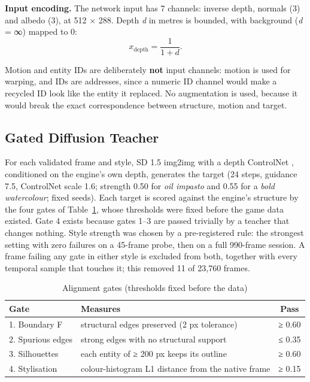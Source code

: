 \documentclass[conference]{IEEEtran}
\begin{document}
\textbf{Input encoding.} The network input has 7 channels: inverse depth, normals (3) and albedo (3), at 512 × 288. Depth \textit{d} in metres is bounded, with background (\textit{d} = ∞) mapped to 0:
\begin{equation}\label{eq:depth}
x_{\mathrm{depth}} = \frac{1}{1+d}.
\end{equation}

Motion and entity IDs are deliberately \textbf{not} input channels: motion is used for warping, and IDs are addresses, since a numeric ID channel would make a recycled ID look like the entity it replaced. No augmentation is used, because it would break the exact correspondence between structure, motion and target.

\subsection{Gated Diffusion Teacher}

For each validated frame and style, SD 1.5 \cite{sd15} img2img with a depth ControlNet \cite{cndepth}, conditioned on the engine's own depth, generates the target (24 steps, guidance 7.5, ControlNet scale 1.6; strength 0.50 for \textit{oil impasto} and 0.55 for a \textit{bold watercolour}; fixed seeds). Each target is scored against the engine's structure by the four gates of Table~\ref{tab:gates}, whose thresholds were fixed before the game data existed. Gate 4 exists because gates 1–3 are passed trivially by a teacher that changes nothing. Style strength was chosen by a pre-registered rule: the strongest setting with zero failures on a 45-frame probe, then on a full 990-frame session. A frame failing any gate in either style is excluded from both, together with every temporal sample that touches it; this removed 11 of 23,760 frames.
\begin{table}[!t]
\caption{Alignment gates (thresholds fixed before the data)}\label{tab:gates}
\centering
\footnotesize
\setlength{\tabcolsep}{4pt}
\begin{tabularx}{\columnwidth}{lXc}
\toprule
Gate & Measures & Pass \\
\midrule
1. Boundary F & structural edges preserved (2 px tolerance) & ≥ 0.60 \\
2. Spurious edges & strong edges with no structural support & ≤ 0.35 \\
3. Silhouettes & each entity of ≥ 200 px keeps its outline & ≥ 0.60 \\
4. Stylisation & colour-histogram L1 distance from the native frame & ≥ 0.15 \\
\bottomrule
\end{tabularx}
\end{table}
\end{document}

